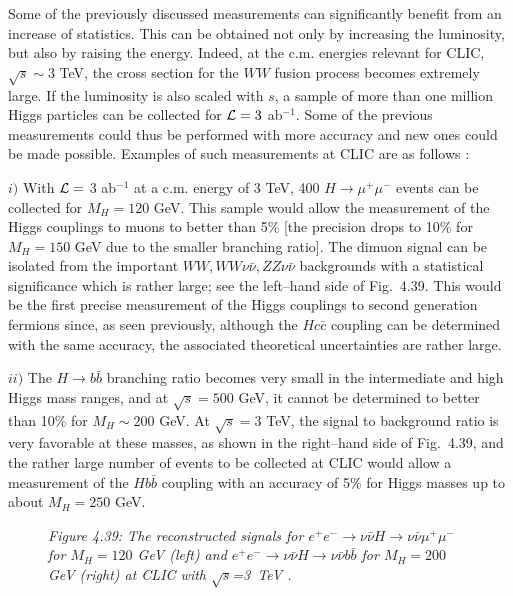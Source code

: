 Some of the previously discussed measurements can significantly benefit from an
increase of
statistics. This can be obtained not only by increasing the luminosity, but 
also by raising the energy. Indeed, at the c.m. energies relevant for CLIC, 
$\sqrt{s} \sim 3$ TeV, the cross section for the $WW$ fusion process becomes 
extremely large. If the luminosity is also scaled with $s$, a sample of more 
than one million Higgs particles can be collected for ${\cal L}=3$ ab$^{-1}$. 
Some of the previous measurements could thus be performed with more accuracy  
and new ones could be made possible. Examples of such measurements at CLIC are 
as follows \cite{CLIC}: \s

$i)$ With $\cal L =$ 3 ab$^{-1}$ at a c.m. energy of 3 TeV, 400 $H \to \mu^+
\mu^-$ events can be collected for $M_H=120$ GeV.  This sample would allow the
measurement of the Higgs couplings to muons to better than 5\%
[the precision drops to 10\% for $M_H=150$ GeV due to the smaller branching
ratio]. The dimuon signal can be isolated from the important $WW, WW\nu \bar
\nu, ZZ \nu\bar \nu$ backgrounds with a statistical significance which is
rather large; see the left--hand side of Fig.~4.39.  This would be the first
precise measurement of the Higgs couplings to second generation fermions since,
as seen previously, although the $Hc\bar{c}$ coupling can be determined with
the same accuracy, the associated theoretical uncertainties are rather large. \s

$ii)$ The $H\to b \bar{b}$ branching ratio becomes very small in the 
intermediate and high Higgs mass ranges, and at $\sqrt{s}=500$ GeV, it cannot 
be determined to better than 10\% for $M_H \sim 200$ GeV. At $\sqrt{s}=3$ TeV,
the signal to background ratio is very favorable at these masses, as shown in 
the right--hand side of Fig.~4.39, and the rather large number 
of events to be collected at CLIC would allow a measurement of the $Hb\bar{b}$ 
coupling with an accuracy of 5\% for Higgs masses up to about $M_H=250$ GeV. 
\s

\begin{figure}[!h]
\vspace*{-0.8cm}
\begin{center}
\end{center}
\vspace*{-0.5cm}
{\sl Figure 4.39: The reconstructed signals for $e^+e^- \to \nu \bar \nu H \to
\nu \bar \nu  \mu^+\mu^-$ for $M_H=120$ GeV (left) and $e^+e^- \to \nu \bar 
\nu  H \to  \nu \bar \nu b\bar{b}$ for $M_H=200$ GeV (right) at CLIC with 
$\sqrt{s}$=3~TeV \cite{ee-H3-Battaglia}.}
\vspace*{-0.5cm}
\end{figure}


